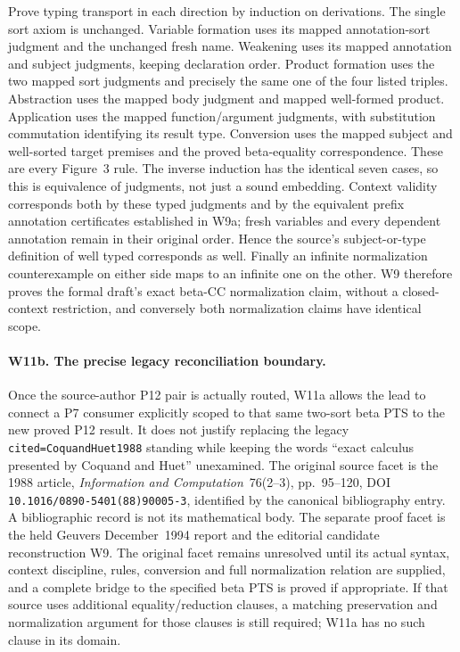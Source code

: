 Prove typing transport in each direction by induction on derivations.
The single sort axiom is unchanged. Variable formation uses its mapped
annotation-sort judgment and the unchanged fresh name. Weakening uses
its mapped annotation and subject judgments, keeping declaration order.
Product formation uses the two mapped sort judgments and precisely the
same one of the four listed triples. Abstraction uses the mapped body
judgment and mapped well-formed product. Application uses the mapped
function/argument judgments, with substitution commutation identifying
its result type. Conversion uses the mapped subject and well-sorted
target premises and the proved beta-equality correspondence. These are
every Figure~3 rule. The inverse induction has the identical seven
cases, so this is equivalence of judgments, not just a sound embedding.
Context validity corresponds both by these typed judgments and by the
equivalent prefix annotation certificates established in W9a; fresh
variables and every dependent annotation remain in their original order.
Hence the source's subject-or-type definition of well typed corresponds
as well. Finally an infinite normalization counterexample on either side
maps to an infinite one on the other. W9 therefore proves the formal
draft's exact beta-CC normalization claim, without a closed-context
restriction, and conversely both normalization claims have identical scope.

\paragraph{W11b. The precise legacy reconciliation boundary.}
Once the source-author P12 pair is actually routed, W11a allows the lead
to connect a P7 consumer explicitly scoped to that same two-sort beta PTS
to the new proved P12 result. It does not justify
replacing the legacy \texttt{cited=CoquandHuet1988} standing while keeping
the words ``exact calculus presented by Coquand and Huet'' unexamined.
The original source facet is the 1988 article, \emph{Information and
Computation}~76(2--3), pp.~95--120, DOI
\texttt{10.1016/0890-5401(88)90005-3}, identified by the canonical
bibliography entry. A bibliographic record is not its mathematical body.
The separate proof facet is the held Geuvers December~1994 report and
the editorial candidate reconstruction W9. The original facet remains
unresolved until its actual syntax, context discipline, rules, conversion
and full normalization relation are supplied, and a complete bridge to
the specified beta PTS is proved if appropriate. If that source uses
additional equality/reduction clauses, a matching preservation and
normalization argument for those clauses is still required; W11a has
no such clause in its domain.

